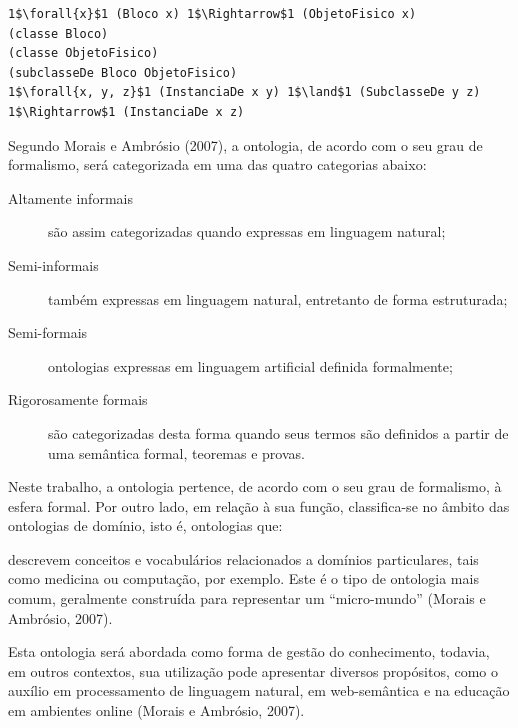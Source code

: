 
\vspace{0.4cm}
\begin{lstlisting}[label={el:logica-1-ordem},frame=single]
1$\forall{x}$1 (Bloco x) 1$\Rightarrow$1 (ObjetoFisico x)
(classe Bloco)
(classe ObjetoFisico)
(subclasseDe Bloco ObjetoFisico)
1$\forall{x, y, z}$1 (InstanciaDe x y) 1$\land$1 (SubclasseDe y z) 1$\Rightarrow$1 (InstanciaDe x z)
\end{lstlisting}

Segundo Morais e Ambrósio (2007),  a ontologia,  de acordo com o seu grau de formalismo, será categorizada em uma das quatro categorias abaixo:
\begin{description}
    \item [Altamente informais] são assim categorizadas quando expressas em linguagem natural;
    \item [Semi-informais] também expressas em linguagem natural, entretanto de forma estruturada;
    \item [Semi-formais] ontologias expressas em linguagem artificial definida formalmente;
    \item [Rigorosamente formais] são categorizadas desta forma quando seus termos são definidos a partir de uma semântica formal, teoremas e provas.
\end{description}

Neste trabalho, a ontologia pertence, de acordo com o seu grau de formalismo, à esfera formal. Por outro lado, em relação à sua função, classifica-se no âmbito das ontologias de domínio, isto é, ontologias que: 
\begin{directcite}
    descrevem conceitos e vocabulários relacionados a domínios particulares, tais como medicina ou computação, por exemplo.  Este é o tipo de ontologia mais comum, geralmente construída para representar um “micro-mundo” (Morais e Ambrósio, 2007).
\end{directcite}Esta ontologia será abordada como forma de gestão do conhecimento, todavia, em outros contextos,  sua utilização pode apresentar diversos propósitos,  como o auxílio em processamento de linguagem natural, em web-semântica e na educação em ambientes online (Morais e Ambrósio, 2007).

